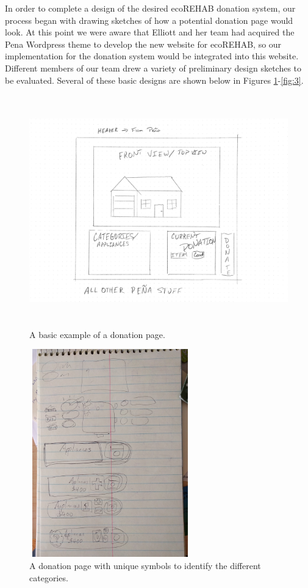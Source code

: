 \documentclass[letter]{article}
\begin{document}
In order to complete a design of the desired ecoREHAB donation system,
our process began with drawing sketches of how a potential donation
page would look. At this point we were aware that Elliott and her team
had acquired the Pena 
Wordpress theme to develop the new website for
ecoREHAB, so our implementation for the donation system would be
integrated into this website. Different members of our team drew a
variety of preliminary design sketches to be evaluated. Several of
these basic designs are shown below in Figures
\ref{fig:1}-\ref{fig:3}.
\begin{figure}[H] %
	\includegraphics[width=15cm, height=10cm]{example}
	\captionsetup{justification=centering}
	\caption{A basic example of a donation page.}
	\label{fig:1}
\end{figure}
\begin{figure}[H]
	\includegraphics[width=7cm, height=9cm]{Example4}
	\captionsetup{justification=centering}
	\centering
	\caption{A donation page with unique symbols to identify the different categories.}
	\label{fig:2}
\end{figure}
\end{document}
